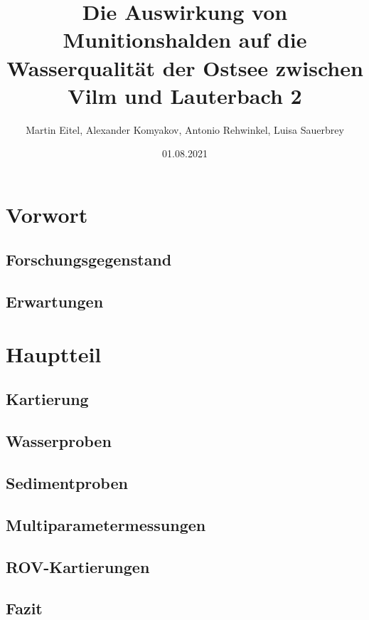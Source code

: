 \documentclass[12pt,titlepage]{scrbook}
\begin{document}
\begin{titlepage}
\title{Die Auswirkung von Munitionshalden auf die Wasserqualität der Ostsee zwischen Vilm und Lauterbach 2}
\date{01.08.2021}
\author{Martin Eitel, Alexander Komyakov, Antonio Rehwinkel, Luisa Sauerbrey}
\maketitle
\end{titlepage}
\tableofcontents
\chapter{Vorwort}
\section{Forschungsgegenstand}
\section{Erwartungen}
\chapter{Hauptteil}
\section{Kartierung}
\section{Wasserproben}
\section{Sedimentproben}
\section{Multiparametermessungen}
\section{ROV-Kartierungen}
\section{Fazit}
\end{document}
